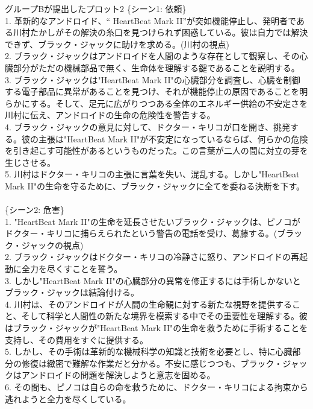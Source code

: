 \documentclass[a4j,12pt]{jsreport}
\begin{document}
\vspace{20pt}
\begin{breakitembox}
   [l]{グループBが提出したプロット2}
   \noindent\{シーン1: 依頼\}\\
   1. 革新的なアンドロイド、“ HeartBeat Mark II”が突如機能停止し、発明者である川村たかしがその解決の糸口を見つけられず困惑している。彼は自力では解決できず、ブラック・ジャックに助けを求める。(川村の視点)\\
   2. ブラック・ジャックはアンドロイドを人間のような存在として観察し、その心臓部分がただの機械部品で無く、生命体を理解する鍵であることを説明する。\\
   3. ブラック・ジャックは"HeartBeat Mark II"の心臓部分を調査し、心臓を制御する電子部品に異常があることを見つけ、それが機能停止の原因であることを明らかにする。そして、足元に広がりつつある全体のエネルギー供給の不安定さを川村に伝え、アンドロイドの生命の危険性を警告する。\\
   4. ブラック・ジャックの意見に対して、ドクター・キリコが口を開き、挑発する。彼の主張は"HeartBeat Mark II"が不安定になっているならば、何らかの危険を引き起こす可能性があるというものだった。この言葉が二人の間に対立の芽を生じさせる。\\
   5. 川村はドクター・キリコの主張に言葉を失い、混乱する。しかし"HeartBeat Mark II"の生命を守るために、ブラック・ジャックに全てを委ねる決断を下す。\\
   \\
   \{シーン2: 危害\}\\
   1. "HeartBeat Mark II"の生命を延長させたいブラック・ジャックは、ピノコがドクター・キリコに捕らえられたという警告の電話を受け、葛藤する。(ブラック・ジャックの視点)\\
   2. ブラック・ジャックはドクター・キリコの冷静さに怒り、アンドロイドの再起動に全力を尽くすことを誓う。\\
   3. しかし"HeartBeat Mark II"の心臓部分の異常を修正するには手術しかないとブラック・ジャックは結論付ける。\\
   4. 川村は、そのアンドロイドが人間の生命観に対する新たな視野を提供すること、そして科学と人間性の新たな境界を模索する中でその重要性を理解する。彼はブラック・ジャックが"HeartBeat Mark II"の生命を救うために手術することを支持し、その費用をすぐに提供する。\\
   5. しかし、その手術は革新的な機械科学の知識と技術を必要とし、特に心臓部分の修復は緻密で難解な作業だと分かる。不安に感じつつも、ブラック・ジャックはアンドロイドの問題を解決しようと意志を固める。\\
   6. その間も、ピノコは自らの命を救うために、ドクター・キリコによる拘束から逃れようと全力を尽くしている。\\

\end{breakitembox}
\end{document}
